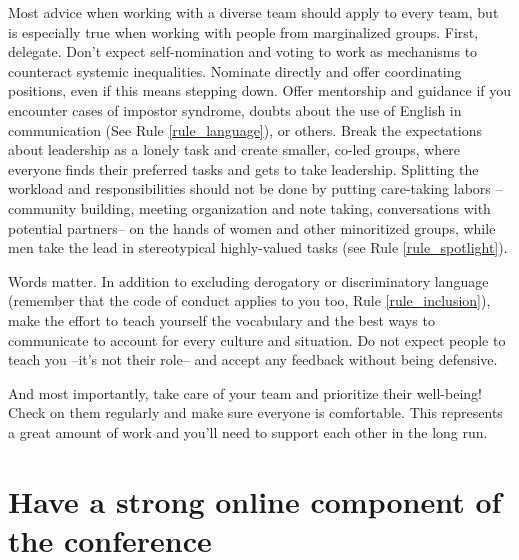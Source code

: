 \documentclass[10pt,letterpaper]{article}
\begin{document}

Most advice when working with a diverse team should apply to every team, but is especially true when working with people from marginalized groups. First, delegate. Don't expect self-nomination and voting to work as mechanisms to counteract systemic inequalities. Nominate directly and offer coordinating positions, even if this means stepping down. Offer mentorship and guidance if you encounter cases of impostor syndrome, doubts about the use of English in communication (See Rule \ref{rule_language}), or others. Break the expectations about leadership as a lonely task and create smaller, co-led groups, where everyone finds their preferred tasks and gets to take leadership. Splitting the workload and responsibilities should not be done by putting care-taking labors --community building, meeting organization and note taking, conversations with potential partners-- on the hands of women and other minoritized groups, while men take the lead in stereotypical highly-valued tasks (see Rule \ref{rule_spotlight}). 

Words matter. In addition to excluding derogatory or discriminatory language (remember that the code of conduct applies to you too, Rule \ref{rule_inclusion}), make the effort to teach yourself the vocabulary and the best ways to communicate to account for every culture and situation. Do not expect people to teach you --it's not their role-- and accept any feedback without being defensive.

And most importantly, take care of your team and prioritize their well-being! Check on them regularly and make sure everyone is comfortable. This represents a great amount of work and you'll need to support each other in the long run.


\section{Have a strong online component of the conference} 
\label{rule_online}
\end{document}
